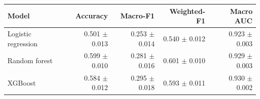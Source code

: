 \begin{tabular}{lrrrr}
\toprule
Model & Accuracy & Macro-F1 & Weighted-F1 & Macro AUC \\
\midrule
Logistic regression & 0.501 $\pm$ 0.013 & 0.253 $\pm$ 0.014 & 0.540 $\pm$ 0.012 & 0.923 $\pm$ 0.003 \\
Random forest & 0.599 $\pm$ 0.010 & 0.281 $\pm$ 0.016 & 0.601 $\pm$ 0.010 & 0.929 $\pm$ 0.003 \\
XGBoost & 0.584 $\pm$ 0.012 & 0.295 $\pm$ 0.018 & 0.593 $\pm$ 0.011 & 0.930 $\pm$ 0.002 \\
\bottomrule
\end{tabular}
